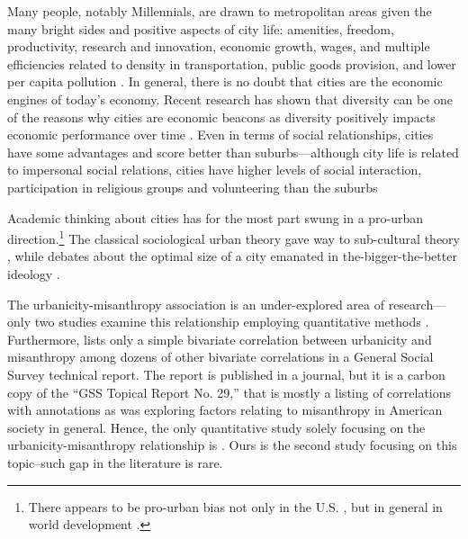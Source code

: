 \documentclass[11pt, letterpaper]{article}
\begin{document}
\begin{spacing}{1.4}
Many people, notably  Millennials, are drawn to metropolitan areas \citep{aok-swbGenYcity18} given the many bright sides and positive aspects of city life: amenities, freedom, productivity, research and innovation, economic growth, wages, and multiple efficiencies related to
density in transportation, public goods provision, and lower per capita pollution \citep{tonnies57,osullivan09,meyer13,rosenthal02,bettencourt10}.
In general, there is no doubt that cities are the economic engines of today's
economy. Recent research has shown that diversity can be one of the reasons why
cities are economic beacons as diversity positively impacts economic performance
over time \citep[e.g.,][]{rodriguez2019does}. Even in terms of social
relationships, cities have some advantages and score better than
suburbs---although city life is related to impersonal social relations, cities have higher levels of social interaction, participation in religious groups and volunteering than the suburbs \citep{nguyen10,mazumdar18}
%


Academic thinking about cities has for the most part swung in a pro-urban direction.\footnote{There appears to be pro-urban bias not only in the U.S. \cite{hansonCityJournalautumn15}, but in general in world development \citep{lipton77}.} The classical sociological urban theory \citep{wirth38,milgram70,park15,park84,simmel03,tonnies57} gave way to
  sub-cultural theory \citep{fischer75,fischer95,wilson85, palisi83}, while debates about the optimal size of a city \citep{richardson72,singell74,alonso60,alonso71,elgin75,capello00} emanated in the-bigger-the-better ideology \citep{glaeser11}. 


The urbanicity-misanthropy association is an under-explored area of research---only two studies examine this relationship employing quantitative methods \citep{wilson85,smith97}. Furthermore, \citet{smith97} lists only a simple bivariate correlation between urbanicity and misanthropy among dozens of other bivariate correlations in a General Social Survey technical report. The report is published in a journal, but it is a carbon copy of the ``GSS Topical Report No. 29,'' that is mostly a listing of correlations with annotations as \citet{smith97} was exploring factors relating to misanthropy in American society in general.
Hence, the only quantitative study solely focusing on the urbanicity-misanthropy
relationship is \citet{wilson85}. Ours is the second study focusing on this topic--such gap in the literature is rare.


\end{spacing}
\end{document}
